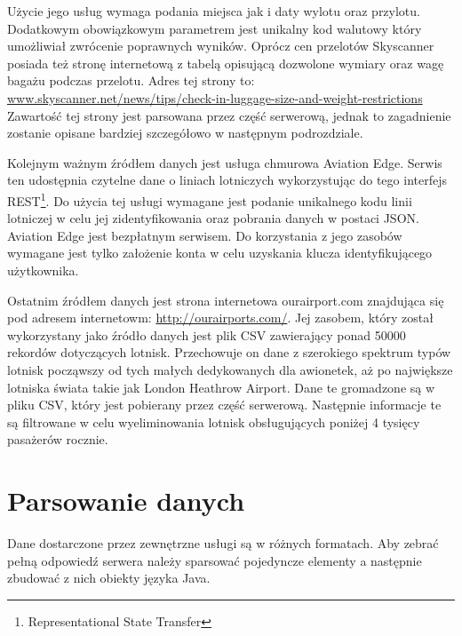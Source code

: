 \documentclass[12pt, twoside]{report}
\begin{document}
Użycie jego usług wymaga podania miejsca jak i daty wylotu oraz przylotu. Dodatkowym obowiązkowym parametrem jest unikalny kod walutowy który umożliwiał zwrócenie poprawnych wyników. Oprócz cen przelotów Skyscanner posiada też stronę internetową z tabelą opisującą dozwolone wymiary oraz wagę bagażu podczas przelotu. Adres tej strony to:\\ \url{www.skyscanner.net/news/tips/check-in-luggage-size-and-weight-restrictions}\\
Zawartość tej strony jest parsowana przez część serwerową, jednak to zagadnienie zostanie opisane bardziej szczegółowo w następnym podrozdziale.

Kolejnym ważnym źródłem danych jest usługa chmurowa Aviation Edge. Serwis ten udostępnia czytelne dane o liniach lotniczych wykorzystując do tego interfejs REST\footnote{Representational State Transfer}. Do użycia tej usługi wymagane jest podanie unikalnego kodu linii lotniczej w celu jej zidentyfikowania oraz pobrania danych w postaci JSON. Aviation Edge jest bezpłatnym serwisem. Do korzystania z jego zasobów wymagane jest tylko założenie konta w celu uzyskania klucza identyfikującego użytkownika.

Ostatnim źródłem danych jest strona internetowa ourairport.com znajdująca się pod adresem internetowm: \url{http://ourairports.com/}. Jej zasobem, który został wykorzystany jako źródło danych jest plik CSV zawierający ponad 50000 rekordów dotyczących lotnisk. Przechowuje on dane z szerokiego spektrum typów lotnisk począwszy od tych małych dedykowanych dla awionetek, aż po największe lotniska świata takie jak London Heathrow Airport. Dane te gromadzone są w pliku CSV, który jest pobierany przez część serwerową. Następnie informacje te są filtrowane w celu wyeliminowania lotnisk obsługujących poniżej 4 tysięcy pasażerów rocznie.

\section{Parsowanie danych}
Dane dostarczone przez zewnętrzne usługi są w różnych formatach. Aby zebrać pełną odpowiedź serwera należy  sparsować pojedyncze elementy a następnie zbudować z nich obiekty języka Java.
\end{document}
